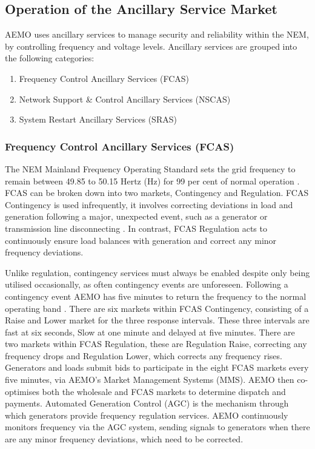 \subsection{ Operation of the Ancillary Service Market }
AEMO uses ancillary services to manage security and reliability within the NEM, by controlling frequency and voltage levels. Ancillary services are grouped into the following categories:
\begin{enumerate}
    \item Frequency Control Ancillary Services (FCAS)
    \item Network Support \& Control Ancillary Services (NSCAS)
    \item System Restart Ancillary Services (SRAS)
\end{enumerate}
\subsubsection{Frequency Control Ancillary Services (FCAS)} \label{fcas}
The NEM Mainland Frequency Operating Standard sets the grid frequency to remain between 49.85 to 50.15 Hertz (Hz) for 99 per cent of normal operation \parencite{FrequencyReq}. FCAS can be broken down into two markets, Contingency and Regulation. FCAS Contingency is used infrequently, it involves correcting deviations in load and generation following a major, unexpected event, such as a generator or transmission line disconnecting \parencite{Boyle}.  In contrast, FCAS Regulation acts to continuously ensure load balances with generation and correct any minor frequency deviations.

Unlike regulation, contingency services must always be enabled despite only being utilised occasionally, as often contingency events are unforeseen. Following a contingency event AEMO has five minutes to return the frequency to the normal operating band \parencite{FrequencyReq}. There are six markets within FCAS Contingency, consisting of a Raise and Lower market for the three response intervals. These three intervals are fast at six seconds, Slow at one minute and delayed at five minutes. There are two markets within FCAS Regulation, these are Regulation Raise, correcting any frequency drops and Regulation Lower, which corrects any frequency rises. Generators and loads submit bids to participate in the eight FCAS markets every five minutes, via AEMO’s Market Management Systems (MMS). AEMO then co-optimises both the wholesale and FCAS markets to determine dispatch and payments. Automated Generation Control (AGC) is the mechanism through which generators provide frequency regulation services. AEMO continuously monitors frequency via the AGC system, sending signals to generators when there are any minor frequency deviations, which need to be corrected.
